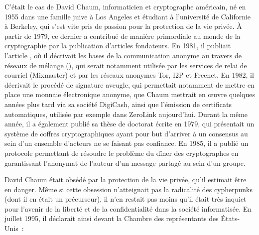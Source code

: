 C'était le cas de David Chaum, informaticien et cryptographe américain, né en 1955 dans une famille juive à Los Angeles et étudiant à l'université de Californie à Berkeley, qui s'est vite pris de passion pour la protection de la vie privée. À partir de 1979, ce dernier a contribué de manière primordiale au monde de la cryptographie par la publication d'articles fondateurs. En 1981, il publiait l'article , où il décrivait les bases de la communication anonyme au travers de réseaux de mélange (), qui serait notamment utilisée par les services de relai de courriel (Mixmaster) et par les réseaux anonymes Tor, I2P et Freenet. En 1982, il décrivait le procédé de signature aveugle, qui permettait notamment de mettre en place une monnaie électronique anonyme, que Chaum mettrait en œuvre quelques années plus tard via sa société DigiCash, ainsi que l'émission de certificats automatiques, utilisée par exemple dans ZeroLink aujourd'hui. Durant la même année, il a également publié sa thèse de doctorat écrite en 1979, qui présentait un système de coffres cryptographiques ayant pour but d'arriver à un consensus au sein d'un ensemble d'acteurs ne se faisant pas confiance. En 1985, il a publié un protocole permettant de résoudre le problème du dîner des cryptographes en garantissant l'anonymat de l'auteur d'un message partagé au sein d'un groupe. %

David Chaum était obsédé par la protection de la vie privée, qu'il estimait être en danger. Même si cette obsession n'atteignait pas la radicalité des cypherpunks (dont il en était un précurseur), il n'en restait pas moins qu'il était très inquiet pour l'avenir de la liberté et de la confidentialité dans la société informatisée. En juillet 1995, il déclarait ainsi devant la Chambre des représentants des États-Unis~:

